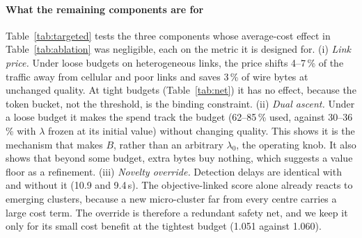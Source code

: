 \paragraph{What the remaining components are for} Table~\ref{tab:targeted} tests the three components whose average-cost effect in Table~\ref{tab:ablation} was negligible, each on the metric it is designed for. (i) \emph{Link price.} Under loose budgets on heterogeneous links, the price shifts 4--7\,\% of the traffic away from cellular and poor links and saves 3\,\% of wire bytes at unchanged quality. At tight budgets (Table~\ref{tab:net}) it has no effect, because the token bucket, not the threshold, is the binding constraint. (ii) \emph{Dual ascent.} Under a loose budget it makes the spend track the budget (62--85\,\% used, against 30--36\,\% with $\lambda$ frozen at its initial value) without changing quality. This shows it is the mechanism that makes $B$, rather than an arbitrary $\lambda_0$, the operating knob. It also shows that beyond some budget, extra bytes buy nothing, which suggests a value floor as a refinement. (iii) \emph{Novelty override.} Detection delays are identical with and without it (10.9 and 9.4\,s). The objective-linked score alone already reacts to emerging clusters, because a new micro-cluster far from every centre carries a large cost term. The override is therefore a redundant safety net, and we keep it only for its small cost benefit at the tightest budget (1.051 against 1.060).

\begin{table}[t]
\centering\small
\caption{Targeted ablations: each component on the metric it is designed for (mean of 5 seeds).}\label{tab:targeted}
\setlength{\tabcolsep}{2pt}
\end{table}


